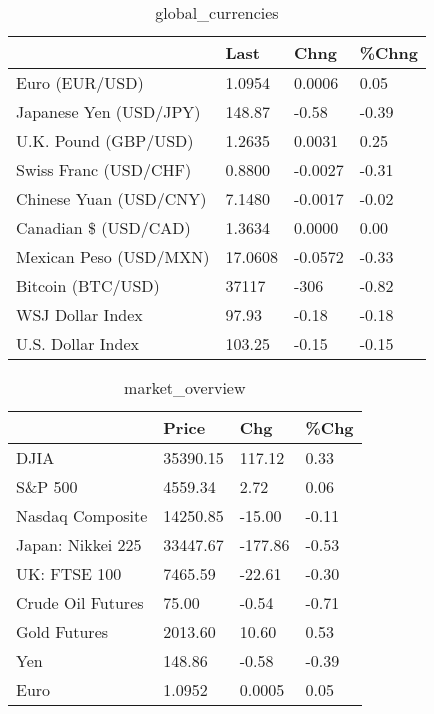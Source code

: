 \documentclass{article}%
\begin{document}
%


\begin{table}[htbp]%
\caption{global\_currencies}%
\centering%
\begin{adjustbox}{width=1\textwidth}%
\begin{tabular}{llll}
\toprule
                       &    Last &    Chng & \%Chng \\
\midrule
        Euro (EUR/USD) &  1.0954 &  0.0006 &  0.05 \\
Japanese Yen (USD/JPY) &  148.87 &   -0.58 & -0.39 \\
  U.K. Pound (GBP/USD) &  1.2635 &  0.0031 &  0.25 \\
 Swiss Franc (USD/CHF) &  0.8800 & -0.0027 & -0.31 \\
Chinese Yuan (USD/CNY) &  7.1480 & -0.0017 & -0.02 \\
  Canadian \$ (USD/CAD) &  1.3634 &  0.0000 &  0.00 \\
Mexican Peso (USD/MXN) & 17.0608 & -0.0572 & -0.33 \\
     Bitcoin (BTC/USD) &   37117 &    -306 & -0.82 \\
      WSJ Dollar Index &   97.93 &   -0.18 & -0.18 \\
     U.S. Dollar Index &  103.25 &   -0.15 & -0.15 \\
\bottomrule
\end{tabular}
%
\end{adjustbox}%
\end{table}

%


\begin{table}[htbp]%
\caption{market\_overview}%
\centering%
\begin{adjustbox}{width=1\textwidth}%
\begin{tabular}{llll}
\toprule
                  &    Price &     Chg &  \%Chg \\
\midrule
             DJIA & 35390.15 &  117.12 &  0.33 \\
          S\&P 500 &  4559.34 &    2.72 &  0.06 \\
 Nasdaq Composite & 14250.85 &  -15.00 & -0.11 \\
Japan: Nikkei 225 & 33447.67 & -177.86 & -0.53 \\
     UK: FTSE 100 &  7465.59 &  -22.61 & -0.30 \\
Crude Oil Futures &    75.00 &   -0.54 & -0.71 \\
     Gold Futures &  2013.60 &   10.60 &  0.53 \\
              Yen &   148.86 &   -0.58 & -0.39 \\
             Euro &   1.0952 &  0.0005 &  0.05 \\
\bottomrule
\end{tabular}
%
\end{adjustbox}%
\end{table}

%
\end{document}

